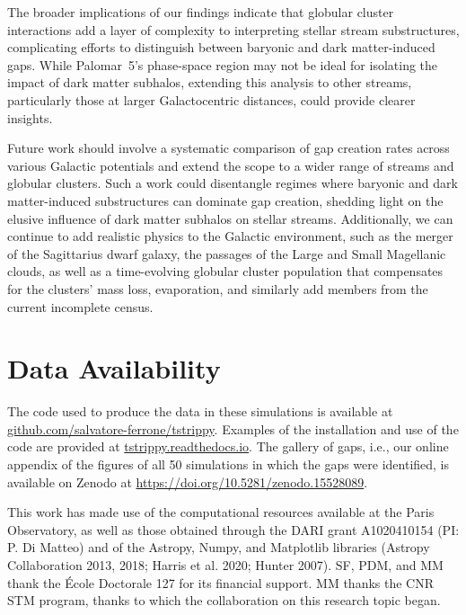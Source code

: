 \documentclass{aa}
\begin{document}
  The broader implications of our findings indicate that globular cluster interactions add a layer of complexity to interpreting stellar stream substructures, complicating efforts to distinguish between baryonic and dark matter-induced gaps. While Palomar~5's phase-space region may not be ideal for isolating the impact of dark matter subhalos, extending this analysis to other streams, particularly those at larger Galactocentric distances, could provide clearer insights. 

  Future work should involve a systematic comparison of gap creation rates across various Galactic potentials and extend the scope to a wider range of streams and globular clusters. Such a work could disentangle regimes where baryonic and dark matter-induced substructures can dominate gap creation, shedding light on the elusive influence of dark matter subhalos on stellar streams. Additionally, we can continue to add realistic physics to the Galactic environment, such as the merger of the Sagittarius dwarf galaxy, the passages of the Large and Small Magellanic clouds, as well as a time-evolving globular cluster population that compensates for the clusters' mass loss, evaporation, and similarly add members from the current incomplete census.


  
\section*{Data Availability}

  The code used to produce the data in these simulations is available at \href{https://github.com/salvatore-ferrone/tstrippy}{github.com/salvatore-ferrone/tstrippy}. Examples of the installation and use of the code are provided at \href{https://tstrippy.readthedocs.io}{tstrippy.readthedocs.io}. The gallery of gaps, i.e., our online appendix of the figures of all 50 simulations in which the gaps were identified, is available on Zenodo at \url{https://doi.org/10.5281/zenodo.15528089}. 




\begin{acknowledgements}
  This work has made use of the computational resources available at the Paris Observatory, as well as those obtained through the DARI grant A1020410154 (PI: P. Di Matteo) and of the Astropy, Numpy, and Matplotlib libraries (Astropy Collaboration 2013, 2018; Harris et al. 2020; Hunter 2007). SF, PDM, and MM thank the École Doctorale 127 for its financial support. MM thanks the CNR STM program, thanks to which the collaboration on this research topic began. 
\end{acknowledgements}
\end{document}
